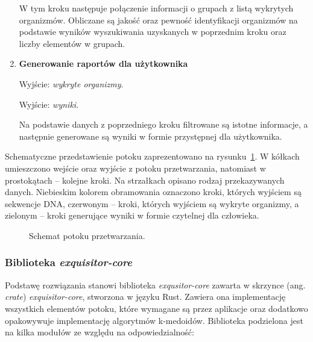 \begin{enumerate}
{                    W tym kroku następuje połączenie informacji o grupach z listą wykrytych organizmów. Obliczane są jakość oraz pewność identyfikacji organizmów na podstawie wyników wyszukiwania uzyskanych w poprzednim kroku oraz liczby elementów w grupach.
                }
                \item {
                    \textbf{Generowanie raportów dla użytkownika}

                    Wyjście: \textit{wykryte organizmy}.

                    Wyjście: \textit{wyniki}.

                    Na podstawie danych z poprzedniego kroku filtrowane są istotne informacje, a następnie generowane są wyniki w formie przystępnej dla użytkownika.
                }
            \end{enumerate}

            Schematyczne przedstawienie potoku zaprezentowano na rysunku~\ref{Picture:Pipeline}. W kółkach umieszczono wejście oraz wyjście z potoku przetwarzania, natomiast w prostokątach – kolejne kroki. Na strzałkach opisano rodzaj przekazywanych danych. Niebieskim kolorem obramowania oznaczono kroki, których wyjściem są sekwencje DNA, czerwonym – kroki, których wyjściem są wykryte organizmy, a zielonym – kroki generujące wyniki w formie czytelnej dla człowieka.

            \begin{figure}
                \begin{center}
                    
                \end{center}
                \caption{
                    Schemat potoku przetwarzania.
                }\label{Picture:Pipeline}
            \end{figure}

        \subsubsection{Biblioteka \textit{exquisitor-core}}
            Podstawę rozwiązania stanowi biblioteka \textit{exqusitor-core} zawarta w skrzynce (ang. \textit{crate}) \textit{exquisitor-core}, stworzona w języku Rust. Zawiera ona implementację wszystkich elementów potoku, które wymagane są przez aplikacje oraz dodatkowo opakowywuje implementację algorytmów k-medoidów. Biblioteka podzielona jest na kilka modułów ze względu na odpowiedzialność:

